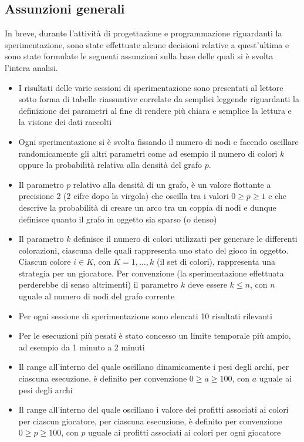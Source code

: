 \subsection{Assunzioni generali}
\justify
In breve, durante l'attività di progettazione e programmazione riguardanti la sperimentazione, sono state effettuate alcune decisioni relative a quest'ultima e sono state formulate le seguenti assunzioni sulla base delle quali si è svolta l'intera analisi.\\

\begin{itemize}
	\item I risultati delle varie sessioni di sperimentazione sono presentati al lettore sotto forma di tabelle riassuntive correlate da semplici leggende riguardanti la definizione dei parametri al fine di rendere più chiara e semplice la lettura e la visione dei dati raccolti
	\item Ogni sperimentazione si è svolta fissando il numero di nodi e facendo oscillare randomicamente gli altri parametri come ad esempio il numero di colori $k$ oppure la probabilità relativa alla densità del grafo $p$.\\
	\item Il parametro $p$ relativo alla densità di un grafo, è un valore flottante a precisione 2 (2 cifre dopo la virgola) che oscilla tra i valori \(0 \geq p \geq 1\) e che descrive la probabilità di creare un arco tra un coppia di nodi e dunque definisce quanto il grafo in oggetto sia sparso (o denso)
	\item Il parametro $k$ definisce il numero di colori utilizzati per generare le differenti colorazioni, ciascuna delle quali rappresenta uno stato del gioco in oggetto. Ciascun colore \(i \in K\), con \(K = 1,\ldots,k\) (il set di colori), rappresenta una strategia per un giocatore. Per convenzione (la sperimentazione effettuata perderebbe di senso altrimenti) il parametro $k$ deve essere \(k \leq n\), con $n$ uguale al numero di nodi del grafo corrente
	\item Per ogni sessione di sperimentazione sono elencati 10 risultati rilevanti 
	\item Per le esecuzioni più pesati è stato concesso un limite temporale più ampio, ad esempio da 1 minuto a 2 minuti
	\item Il range all'interno del quale oscillano dinamicamente i pesi degli archi, per ciascuna esecuzione, è definito per convenzione \(0 \geq a \geq 100\), con $a$ uguale ai pesi degli archi
	\item Il range all'interno del quale oscillano i valore dei profitti associati ai colori per ciascun giocatore, per ciascuna esecuzione, è definito per convenzione \(0 \geq p \geq 100\), con $p$ uguale ai profitti associati ai colori per ogni giocatore
\end{itemize}

